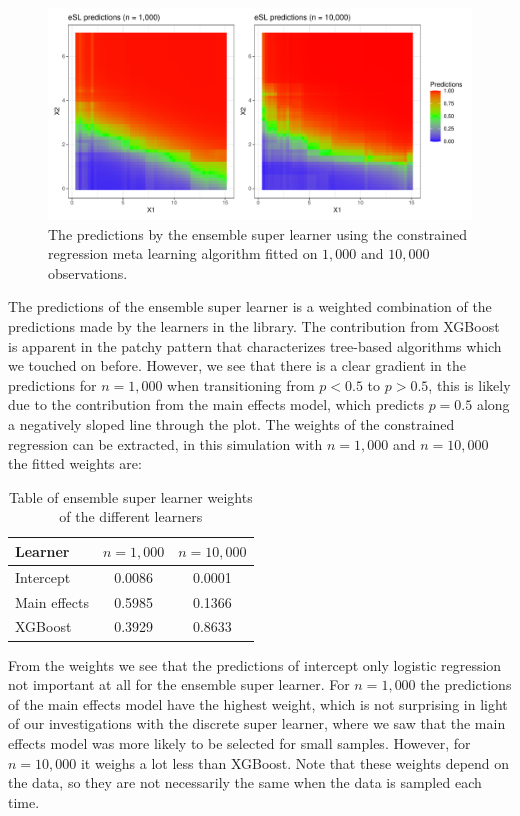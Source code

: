 \documentclass[./main.tex]{subfiles}
\begin{document}
\begin{figure}[H]
    \centering
    \includegraphics[width=\textwidth]{figures/esl_preds_par.pdf}
    \caption{The predictions by the ensemble super learner using the constrained regression meta learning algorithm fitted on $ 1,000 $ and $ 10,000 $ observations.}
    \label{fig:esl_preds_quad_prog}
\end{figure}
The predictions of the ensemble super learner is a weighted combination of the predictions made by the learners in the library. The contribution from XGBoost is apparent in the patchy pattern that characterizes tree-based algorithms which we touched on before. However, we see that there is a clear gradient in the predictions for $ n = 1,000 $ when transitioning from $ p < 0.5 $ to $ p > 0.5 $, this is likely due to the contribution from the main effects model, which predicts $ p = 0.5 $ along a negatively sloped line through the plot. The weights of the constrained regression can be extracted, in this simulation with $ n = 1,000 $ and $ n = 10,000 $ the fitted weights are: 
\begin{table}[H]
\centering
\begin{tabular}{lcc}
\hline
Learner & $ n = 1,000 $ & $ n = 10,000 $\\
\hline
Intercept & 0.0086 & 0.0001 \\
Main effects & 0.5985 & 0.1366 \\
XGBoost & 0.3929 & 0.8633 \\
\hline
\end{tabular}
\caption{Table of ensemble super learner weights of the different learners}
\end{table}
From the weights we see that the predictions of intercept only logistic regression not important at all for the ensemble super learner. For $ n = 1,000 $ the predictions of the main effects model have the highest weight, which is not surprising in light of our investigations with the discrete super learner, where we saw that the main effects model was more likely to be selected for small samples. However, for $ n = 10,000 $ it weighs a lot less than XGBoost. Note that these weights depend on the data, so they are not necessarily the same when the data is sampled each time. 
\end{document}
